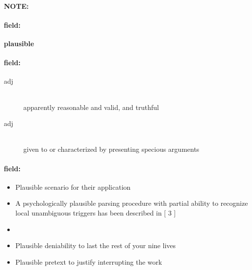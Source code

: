 \documentclass[12pt]{article}
\newenvironment{note}{\paragraph{NOTE:}}{}
\newenvironment{field}{\paragraph{field:}}{}
\begin{document}
\begin{note}
\begin{field}
\textbf{\large plausible}
\end{field}


\begin{field}
\begin{description}
\item[adj] \hfill \\ 
apparently reasonable and valid, and truthful

\item[adj] \hfill \\ 
given to or characterized by presenting specious arguments

\end{description}
\end{field}

\begin{field}
\begin{itemize}
\item Plausible scenario for their application
\item A psychologically plausible parsing procedure with partial ability to recognize local unambiguous triggers has been described in [ 3 ] 
\item 
\item Plausible deniability to last the rest of your nine lives
\item Plausible pretext to justify interrupting the work
\end{itemize}
\end{field}
\end{note}
\end{document}
